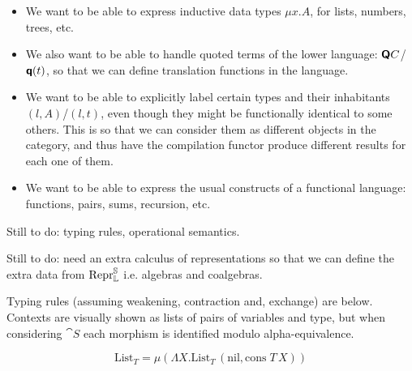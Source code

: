 \begin{itemize}
  \item We want to be able to express inductive data types $\mu x . A$, for lists,
        numbers, trees, etc.
  \item We also want to be able to handle quoted terms of the lower language: $\textsf{\textbf{Q}}
          C$/$\textsf{\textbf{q}}(t)$, so that we can define translation functions in the language.
  \item We want to be able to explicitly label certain types and their inhabitants $(l,
          A)$/$(l, t)$, even though they might be functionally identical to some others.
        This is so that we can consider them as different objects in the category, and
        thus have the compilation functor produce different results for each one of
        them.
  \item We want to be able to express the usual constructs of a functional language:
        functions, pairs, sums, recursion, etc.
\end{itemize}

Still to do: typing rules, operational semantics.

Still to do: need an extra calculus of representations so that we can define
the extra data from $\mathrm{Repr} _{\mathbb L} ^{\mathbb S}$ i.e. algebras and coalgebras.

Typing rules (assuming weakening, contraction and, exchange) are below.
Contexts are visually shown as lists of pairs of variables and type, but when
considering $\cat S$ each morphism is identified modulo alpha-equivalence.

$$
  \text{List}_T = \mu (\Lambda X. \text{List}_T \, (\text{nil}, \text{cons}\; T\, X) )
$$

